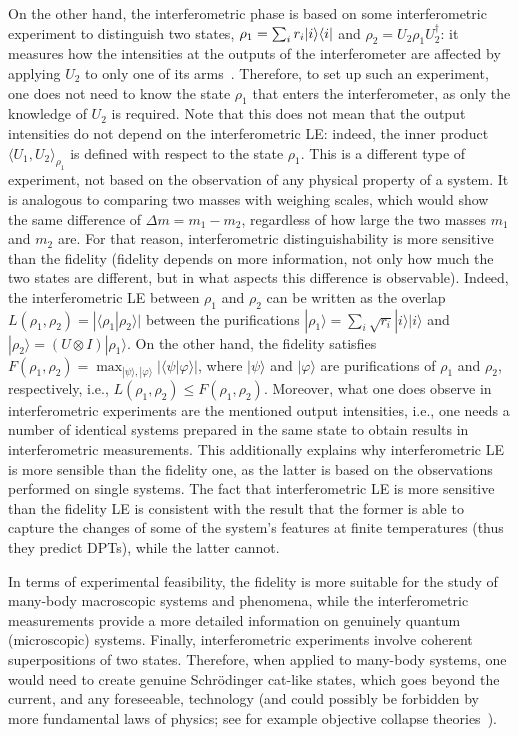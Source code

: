 On the other hand, the interferometric phase is based on some interferometric experiment to distinguish two states, $\rho_1 = \sum_i r_i | i \rangle\langle i |$ and $\rho_2 = U_2 \rho_1 U_2^{\dagger}$: it measures how the intensities at the outputs of the interferometer are affected by applying $U_2$ to only one of its arms~\cite{sjo:pat:eke:ana:eri:oi:ved:00}. Therefore, to set up such an experiment, one does not need to know the state $\rho_1$ that enters the interferometer, as only the knowledge of $U_2$ is required. Note that this does not mean that the output intensities do not depend on the interferometric LE: indeed, the inner product $\langle U_1,U_2\rangle_{\rho_1}$ is defined with respect to the state $\rho_1$. This is a different type of experiment, not based on the observation of any physical property of a system. It is analogous to comparing two masses with weighing scales, which would show the same difference of $\Delta m = m_1 - m_2$, regardless of how large the two masses $m_1$ and $m_2$ are. For that reason, interferometric distinguishability is more sensitive than the fidelity (fidelity depends on more information, not only how much the two states are different, but in what aspects this difference is observable). Indeed,  the interferometric LE between $\rho_1$ and $\rho_2$ can be written as the overlap $L(\rho_1, \rho_2) = |\langle \rho_1|\rho_2\rangle|$ between the purifications $|\rho_1\rangle = \sum_i  \sqrt{r_i} |i\rangle|i\rangle$ and $|\rho_2\rangle=(U\otimes I)|\rho_1\rangle$. On the other hand, the fidelity satisfies $F(\rho_1, \rho_2) = \max_{|\psi\rangle,|\varphi\rangle} |\langle\psi|\varphi\rangle|$, where $|\psi\rangle$ and $|\varphi\rangle$ are purifications of $\rho_1$ and $\rho_2$, respectively, i.e., $L(\rho_1, \rho_2) \leq F(\rho_1, \rho_2)$. Moreover, what one does observe in interferometric experiments are the mentioned output intensities, i.e., one needs a number of identical systems prepared in the same state to obtain results in interferometric measurements. This additionally explains why interferometric LE is more sensible than the fidelity one, as the latter is based on the observations performed on single systems. The fact that interferometric LE is more sensitive than the fidelity LE is consistent with the result that the former is able to capture the changes of some of the system's features at finite temperatures (thus they predict DPTs), while the latter cannot.

In terms of experimental feasibility, the fidelity is more suitable for the study of many-body macroscopic systems and phenomena, while the interferometric measurements provide a more detailed information on genuinely quantum (microscopic) systems. Finally, interferometric experiments involve coherent superpositions of two states. Therefore, when applied to many-body systems, one would need to create genuine Schr\"{o}dinger cat-like states, which goes beyond the current, and any foreseeable, technology (and could possibly be forbidden by more fundamental laws of physics; see for example objective collapse theories~\cite{bas:loc:sat:sin:ulb:13}).  

